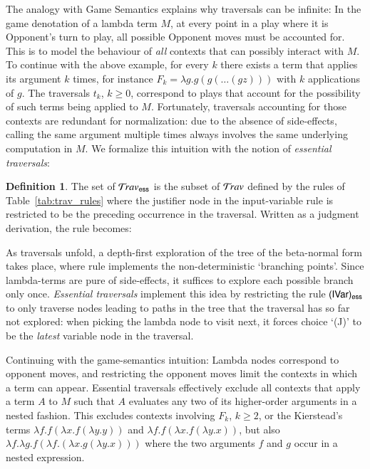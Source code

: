 \documentclass{elsarticle}
\theoremstyle{plain}
\theoremstyle{definition}
\newtheorem{definition}{Definition}[section]
\newcommand\Nodes{\mathcal{N}}%
\newcommand\ExtendedNodesVar{\tilde{\Nodes}_{\sf var}}
\newcommand\ExtendedNodesLmd{\tilde{\Nodes}_{\lambda}}
\newcommand{\essential}{{\sf ess}}
\newcommand{\travsetes}{{\travset_\essential}} %
\newcommand{\travulc}{\travset}
\newcommand{\rulefont}[1]{\mathbf{\sf #1}}
\newcommand{\enables}{\vdash} %
\newcommand{\ExternalNodes}{\Nodes^{\sf ext}}
\def\istraversal{\models}
\begin{document}
The analogy with Game Semantics explains why traversals can be infinite: In the game denotation of a lambda term $M$, at every point in a play where it is Opponent's turn to play, all possible Opponent moves must be accounted for.
This is to model the behaviour of \emph{all} contexts that can possibly interact with $M$. To continue with the above example, for every $k$ there exists a term that applies its argument $k$ times, for instance $F_k = \lambda g . g (g ( \ldots (g z)))$ with $k$ applications of $g$.
The traversals $t_k$, $k\geq 0$, correspond to plays
 that account for the possibility of
 such terms being applied to $M$. Fortunately, traversals accounting for those contexts are redundant for normalization: due to the absence of side-effects, calling the same argument multiple times always involves the same underlying computation in $M$. We formalize this intuition with the notion of \emph{essential traversals}:

\begin{definition}
\label{def:essential_traversals}
The set of  $\travsetes$ is the subset of $\travulc$ defined by the rules of Table~\ref{tab:trav_rules} where the justifier node in the input-variable rule  is restricted to be the preceding occurrence in the traversal. Written as a judgment derivation, the rule becomes:
\infrule[$\rulefont{IVar_\essential}$]
     {\istraversal t \cdot n
      \andalso n \in\ExternalNodes\inter\ExtendedNodesVar
      \andalso \nu \in\ExtendedNodesLmd
      \andalso n \enables_i\nu
      \andalso i \geq 1
     }
     {\istraversal  {}}
\end{definition}

As traversals unfold, a depth-first exploration of the tree of the beta-normal form takes place, where rule  implements the non-deterministic `branching points'. Since lambda-terms are pure of side-effects,
it suffices to explore each possible branch only once.
\emph{Essential traversals} implement this idea by restricting the rule $\rulenamet{IVar}_\essential$ to only traverse nodes leading to paths in the tree that the traversal has so far not explored: when picking the lambda node to visit next, it forces choice `(J)' to be the \emph{latest} variable node in the traversal.

Continuing with the game-semantics intuition: Lambda nodes correspond to opponent moves, and restricting the opponent moves limit the contexts in which a term can appear.
Essential traversals effectively exclude all contexts that apply a term $A$ to $M$ such that $A$ evaluates any two of its higher-order arguments in a nested fashion. This excludes contexts involving $F_k$, $k\geq 2$, or the Kierstead's terms $\lambda f .f (\lambda x .f (\lambda y.y))$ and $\lambda f .f (\lambda x .f (\lambda y.x))$, but also $\lambda f. \lambda g . f (\lambda f .(\lambda x . g (\lambda y . x)))$ where the two arguments $f$ and $g$ occur in a nested expression.
\end{document}
